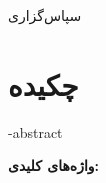 \newpage\thispagestyle{empty}
{\nastaliq
سپاس‌گزاری
}





















\newpage\clearpage

\pagestyle{style2}

\vspace*{-1cm}
\section*{\centering چکیده}
\vspace*{.5cm}
\ffa-abstract
\vspace*{2cm}


{\noindent\large\textbf{واژه‌های کلیدی:}}\par
\vspace*{.5cm}
\fkeywords